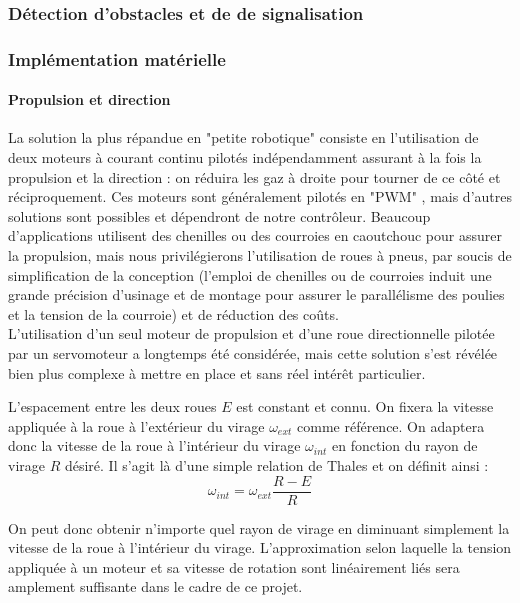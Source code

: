 	\subsubsection{Détection d'obstacles et de de signalisation}


	\subsubsection{Implémentation matérielle}

		\paragraph{Propulsion et direction}

			La solution la plus répandue en "petite robotique" consiste en l'utilisation de deux moteurs à courant continu pilotés indépendamment assurant à la fois la propulsion et la direction : on réduira les gaz à droite pour tourner de ce côté et réciproquement. Ces moteurs sont généralement pilotés en "PWM" , mais d'autres solutions sont possibles et dépendront de notre contrôleur. Beaucoup d'applications utilisent des chenilles ou des courroies en caoutchouc pour assurer la propulsion, mais nous privilégierons l’utilisation de roues à pneus, par soucis de simplification de la conception (l'emploi de chenilles ou de courroies induit  une grande précision d'usinage et de montage pour assurer le parallélisme des poulies et la tension de la courroie) et de réduction des coûts.\\

			L'utilisation d'un seul moteur de propulsion et d'une roue directionnelle pilotée par un servomoteur a longtemps été considérée, mais cette solution s'est révélée bien plus complexe à mettre en place et sans réel intérêt particulier.\\


			L'espacement entre les deux roues $E$ est constant et connu.
			On fixera la vitesse appliquée à la roue à l'extérieur du virage $\omega_{ext}$ comme référence.
			On adaptera donc la vitesse de la roue à l'intérieur du virage $\omega_{int}$ en fonction du rayon de virage $R$ désiré.
			Il s'agit là d'une simple relation de Thales et on définit ainsi :
			\[\omega_{int} = \omega_{ext}\frac{R-E}{R}\]

			On peut donc obtenir n'importe quel rayon de virage en diminuant simplement la vitesse de la roue à l'intérieur du virage.
			L'approximation selon laquelle la tension appliquée à un moteur et sa vitesse de rotation sont linéairement liés sera amplement suffisante dans le cadre de ce projet.\\


